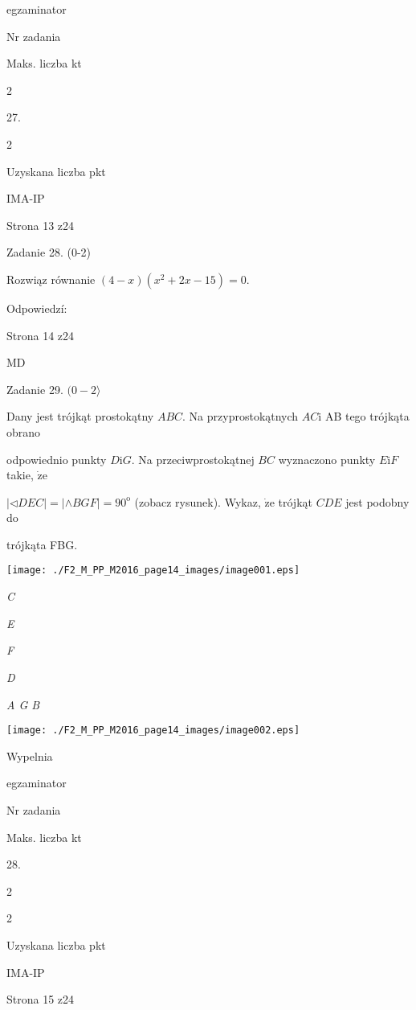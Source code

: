 \documentclass[a4paper,12pt]{article}
\begin{document}
egzaminator

Nr zadania

Maks. liczba kt

2

27.

2

Uzyskana liczba pkt

IMA-IP

Strona 13 z24





Zadanie 28. (0-2)

Rozwiąz równanie $(4-x)(x^{2}+2x-15)=0.$

Odpowiedzí:

Strona 14 z24

MD





Zadanie 29. $(0-2\rangle$

Dany jest trójkąt prostokątny $ABC$. Na przyprostokątnych $AC\mathrm{i}$ AB tego trójkąta obrano

odpowiednio punkty $D\mathrm{i}G$. Na przeciwprostokątnej $BC$ wyznaczono punkty $E\mathrm{i}F$ takie, $\dot{\mathrm{z}}\mathrm{e}$

$|\triangleleft DEC|=|\wedge BGF|=90^{\mathrm{o}}$ (zobacz rysunek). Wykaz, $\dot{\mathrm{z}}\mathrm{e}$ trójkąt $CDE$ jest podobny do

trójkąta FBG.
\begin{center}
\texttt{[image: ./F2\_M\_PP\_M2016\_page14\_images/image001.eps]}
\end{center}
{\it C}

{\it E}

{\it F}

{\it D}

{\it A  G B}
\begin{center}
\texttt{[image: ./F2\_M\_PP\_M2016\_page14\_images/image002.eps]}
\end{center}
Wypelnia

egzaminator

Nr zadania

Maks. liczba kt

28.

2

2

Uzyskana liczba pkt

IMA-IP

Strona 15 z24
\end{document}
